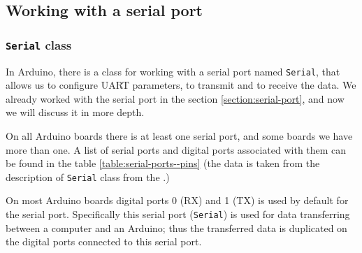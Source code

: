 \documentclass[../sparc.tex]{subfiles}
\begin{document}

\subsection{Working with a serial port}

\subsubsection{\texttt{Serial} class}

In Arduino, there is a class for working with a serial port named
\texttt{Serial}, that allows us to configure \gls{UART} parameters, to transmit
and to receive the data.  We already worked with the serial port in the section
\ref{section:serial-port}, and now we will discuss it in more depth.

On all Arduino boards there is at least one serial port, and some boards we have
more than one.  A list of serial ports and digital ports associated with them
can be found in the table \ref{table:serial-ports--pins} (the data is taken from
the description of \texttt{Serial} class from the \cite{arduino:reference}.)


On most Arduino boards digital ports 0 (RX) and 1 (TX) is used by default for
the serial port.  Specifically this serial port (\texttt{Serial}) is used for
data transferring between a computer and an Arduino; thus the transferred data
is duplicated on the digital ports connected to this serial port.
\end{document}
